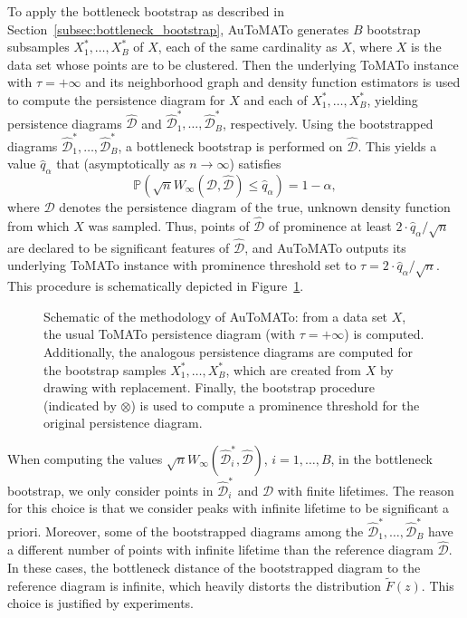 \documentclass[10pt]{article} %
\theoremstyle{plain}
\newcommand{\PPP}{\mathbb{P}}
\newcommand{\DD}{\mathcal{D}}
\newcommand{\aut}{AuToMATo\xspace}
\newcommand{\tom}{ToMATo\xspace}
\newcommand{\bneck}[2]{W_{\infty}(#1,#2)}
\begin{document}
To apply the bottleneck bootstrap as described in Section~\ref{subsec:bottleneck_bootstrap}, \aut generates \(B\) bootstrap subsamples \(X_{1}^{*},\dots,X_{B}^{*}\) of \(X\), each of the same cardinality as \(X\), where \(X\) is the data set whose points are to be clustered.
Then the underlying \tom instance with \(\tau=+\infty\) and its neighborhood graph and density function estimators is used to compute the persistence diagram for \(X\) and each of \(X_{1}^{*},\dots,X_{B}^{*}\), yielding persistence diagrams \(\widehat{\DD}\) and \(\widehat{\DD}_{1}^{*},\dots,\widehat{\DD}_{B}^{*}\), respectively. Using the bootstrapped diagrams \(\widehat{\DD}_{1}^{*},\dots,\widehat{\DD}_{B}^{*}\), a bottleneck bootstrap is performed on \(\widehat{\DD}\). This yields a value \(\widehat{q}_{\alpha}\) that (asymptotically as \(n\to\infty\)) satisfies \[
\PPP(\sqrt{n}\bneck{\DD}{\widehat{\DD}}\leq \widehat{q}_{\alpha})=1-\alpha,
\] where \(\DD\) denotes the persistence diagram of the true, unknown density function from which \(X\) was sampled. Thus, points of \(\widehat{\DD}\) of prominence at least \(2\cdot\widehat{q}_{\alpha}/\sqrt{n}\) are declared to be significant features of \(\widehat{\DD}\), and \aut outputs its underlying \tom instance with prominence threshold set to \(\tau=2\cdot\widehat{q}_{\alpha}/\sqrt{n}\).
This procedure is schematically depicted in Figure~\ref{fig:method}.

\begin{figure}[ht]
    \centering
    \def\svgscale{1}
    
    \caption{Schematic of the methodology of \aut: from a data set \(X\), the usual \tom persistence diagram (with \(\tau=+\infty\)) is computed. Additionally, the analogous persistence diagrams are computed for the bootstrap samples \(X_{1}^{*},\dots,X_{B}^{*}\), which are created from \(X\) by drawing with replacement. Finally, the bootstrap procedure (indicated by \(\otimes\)) is used to compute a prominence threshold for the original persistence diagram.
    }
    \label{fig:method}
\end{figure}

When computing the values \(\sqrt{n}\bneck{\widehat{\DD}_{i}^{*}}{\widehat{\DD}}\), \(i=1,\dots,B\), in the bottleneck bootstrap, we only consider points in \(\widehat{\DD}_{i}^{*}\) and \(\widehat{\DD}\) with finite lifetimes. The reason for this choice is that we consider peaks with infinite lifetime to be significant a priori. Moreover, some of the bootstrapped diagrams among the \(\widehat{\DD}_{1}^{*},\dots,\widehat{\DD}_{B}^{*}\) have a different number of points with infinite lifetime than the reference diagram \(\widehat{\DD}\). In these cases, the bottleneck distance of the bootstrapped diagram to the reference diagram is infinite, which heavily distorts the distribution \(\widetilde{F}(z)\).
This choice is justified by experiments.
\end{document}
